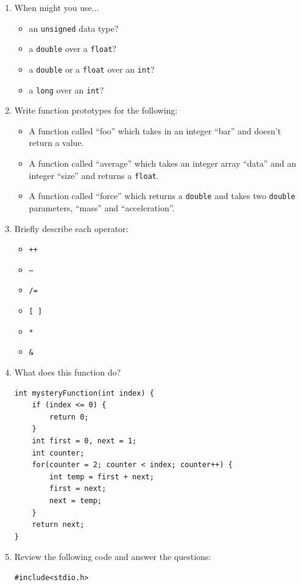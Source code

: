 \documentclass[letter,11pt]{article}
\begin{document}
\begin{enumerate}
    \item When might you use...
    \begin{itemize}
        \item an \texttt{unsigned} data type?
        \item a \texttt{double} over a \texttt{float}?
        \item a \texttt{double} or a \texttt{float} over an \texttt{int}?
        \item a \texttt{long} over an \texttt{int}?
    \end{itemize}
    
    \item Write function prototypes for the following:
    \begin{itemize}
        \item A function called ``foo'' which takes in an integer ``bar'' and doesn't return a value.
        \item A function called ``average'' which takes an integer array ``data'' and an integer ``size'' and returns a \texttt{float}.
        \item A function called ``force'' which returns a \texttt{double} and takes two \texttt{double} parameters, ``mass'' and ``acceleration''.
    \end{itemize}
    
    \item Briefly describe each operator:
    \begin{itemize}
        \item \texttt{++}
        \item \texttt{--}
        \item \texttt{/=}
        \item \texttt{[ ]}
        \item \texttt{*}
        \item \texttt{\&}
    \end{itemize}
    
    \item What does this function do?
    \begin{verbatim}
int mysteryFunction(int index) {
    if (index <= 0) {
        return 0;
    }
    int first = 0, next = 1;
    int counter;
    for(counter = 2; counter < index; counter++) {
        int temp = first + next;
        first = next;
        next = temp;
    }
    return next;
}
    \end{verbatim}
    
    \item Review the following code and answer the questions:
    \begin{verbatim}
#include<stdio.h>


\end{verbatim}
\end{enumerate}
\end{document}
